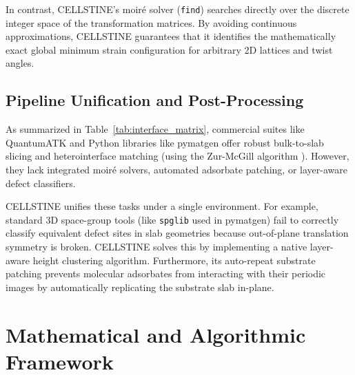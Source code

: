 \documentclass[9pt,a4paper,twoside]{tau-class/tau}
\begin{document}
In contrast, CELLSTINE's moir\'e solver (\texttt{find}) searches directly over the discrete integer space of the transformation matrices. By avoiding continuous approximations, CELLSTINE guarantees that it identifies the mathematically exact global minimum strain configuration for arbitrary 2D lattices and twist angles.

\subsection{Pipeline Unification and Post-Processing}
As summarized in Table~\ref{tab:interface_matrix}, commercial suites like QuantumATK \cite{quantumatk} and Python libraries like pymatgen \cite{pymatgen} offer robust bulk-to-slab slicing and heterointerface matching (using the Zur-McGill algorithm \cite{zur1984systematic}). However, they lack integrated moir\'e solvers, automated adsorbate patching, or layer-aware defect classifiers. 

CELLSTINE unifies these tasks under a single environment. For example, standard 3D space-group tools (like \texttt{spglib} used in pymatgen) fail to correctly classify equivalent defect sites in slab geometries because out-of-plane translation symmetry is broken. CELLSTINE solves this by implementing a native layer-aware height clustering algorithm. Furthermore, its auto-repeat substrate patching prevents molecular adsorbates from interacting with their periodic images by automatically replicating the substrate slab in-plane.


\section{Mathematical and Algorithmic Framework}
\label{sec:methodology}
\end{document}
